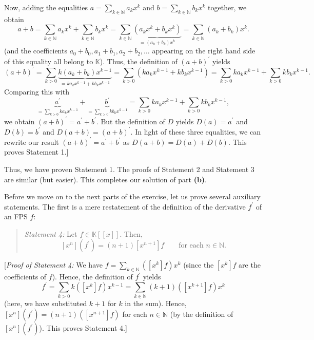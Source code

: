 \documentclass[paper=a4, fontsize=12pt]{scrartcl}%
\let\sumnonlimits\sum
\renewcommand{\sum}{\sumnonlimits\limits}
\theoremstyle{plainsl}
\theoremstyle{definition}
\theoremstyle{remark}
\newenvironment{statement}{\begin{quote}}{\end{quote}}
\begin{document}
Now, adding the equalities $a=\sum_{k\in\mathbb{N}}a_{k}x^{k}$ and
$b=\sum_{k\in\mathbb{N}}b_{k}x^{k}$ together, we obtain
\[
a+b=\sum_{k\in\mathbb{N}}a_{k}x^{k}+\sum_{k\in\mathbb{N}}b_{k}x^{k}=\sum
_{k\in\mathbb{N}}\underbrace{\left(  a_{k}x^{k}+b_{k}x^{k}\right)  }_{=\left(
a_{k}+b_{k}\right)  x^{k}}=\sum_{k\in\mathbb{N}}\left(  a_{k}+b_{k}\right)
x^{k}.
\]
(and the coefficients $a_{0}+b_{0},a_{1}+b_{1},a_{2}+b_{2},\ldots$ appearing
on the right hand side of this equality all belong to $\mathbb{K}$). Thus, the
definition of $\left(  a+b\right)  ^{\prime}$ yields%
\[
\left(  a+b\right)  ^{\prime}=\sum_{k>0}\underbrace{k\left(  a_{k}%
+b_{k}\right)  x^{k-1}}_{=ka_{k}x^{k-1}+kb_{k}x^{k-1}}=\sum_{k>0}\left(
ka_{k}x^{k-1}+kb_{k}x^{k-1}\right)  =\sum_{k>0}ka_{k}x^{k-1}+\sum_{k>0}%
kb_{k}x^{k-1}.
\]
Comparing this with%
\[
\underbrace{a^{\prime}}_{=\sum_{k>0}ka_{k}x^{k-1}}+\underbrace{b^{\prime}%
}_{=\sum_{k>0}kb_{k}x^{k-1}}=\sum_{k>0}ka_{k}x^{k-1}+\sum_{k>0}kb_{k}x^{k-1},
\]
we obtain $\left(  a+b\right)  ^{\prime}=a^{\prime}+b^{\prime}$. But the
definition of $D$ yields $D\left(  a\right)  =a^{\prime}$ and $D\left(
b\right)  =b^{\prime}$ and $D\left(  a+b\right)  =\left(  a+b\right)
^{\prime}$. In light of these three equalities, we can rewrite our result
$\left(  a+b\right)  ^{\prime}=a^{\prime}+b^{\prime}$ as $D\left(  a+b\right)
=D\left(  a\right)  +D\left(  b\right)  $. This proves Statement 1.]

Thus, we have proven Statement 1. The proofs of Statement 2 and Statement 3
are similar (but easier). This completes our solution of part \textbf{(b)}.

\bigskip

Before we move on to the next parts of the exercise, let us prove several
auxiliary statements. The first is a mere restatement of the definition of the
derivative $f^{\prime}$ of an FPS $f$:

\begin{statement}
\textit{Statement 4:} Let $f\in\mathbb{K}\left[  \left[  x\right]  \right]  $.
Then,%
\[
\left[  x^{n}\right]  \left(  f^{\prime}\right)  =\left(  n+1\right)  \left[
x^{n+1}\right]  f\qquad\text{for each }n\in\mathbb{N}\text{.}%
\]

\end{statement}

[\textit{Proof of Statement 4:} We have $f=\sum_{k\in\mathbb{N}}\left(
\left[  x^{k}\right]  f\right)  x^{k}$ (since the $\left[  x^{k}\right]  f$
are the coefficients of $f$). Hence, the definition of $f^{\prime}$ yields%
\[
f^{\prime}=\sum_{k>0}k\left(  \left[  x^{k}\right]  f\right)  x^{k-1}%
=\sum_{k\in\mathbb{N}}\left(  k+1\right)  \left(  \left[  x^{k+1}\right]
f\right)  x^{k}%
\]
(here, we have substituted $k+1$ for $k$ in the sum). Hence, $\left[
x^{n}\right]  \left(  f^{\prime}\right)  =\left(  n+1\right)  \left(  \left[
x^{n+1}\right]  f\right)  $ for each $n\in\mathbb{N}$ (by the definition of
$\left[  x^{n}\right]  \left(  f^{\prime}\right)  $). This proves Statement 4.]
\end{document}

